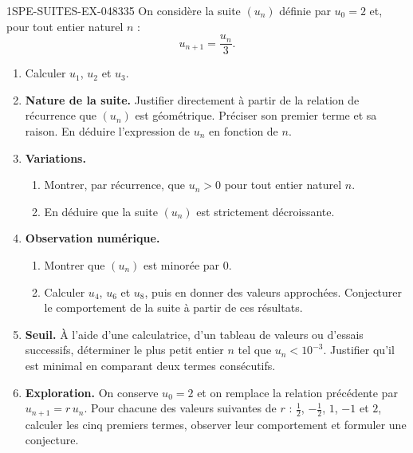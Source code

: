\begin{exercice}{1SPE-SUITES-EX-048}{3}{35}
On considère la suite $(u_n)$ définie par $u_0 = 2$ et, pour tout entier naturel $n$ :
\[
  u_{n+1} = \frac{u_n}{3}.
\]

\begin{enumerate}
  \item Calculer $u_1$, $u_2$ et $u_3$.

  \item \textbf{Nature de la suite.} Justifier directement à partir de la relation de récurrence que $(u_n)$ est géométrique. Préciser son premier terme et sa raison. En déduire l'expression de $u_n$ en fonction de $n$.

  \item \textbf{Variations.}
  \begin{enumerate}
    \item Montrer, par récurrence, que $u_n > 0$ pour tout entier naturel $n$.
    \item En déduire que la suite $(u_n)$ est strictement décroissante.
  \end{enumerate}

  \item \textbf{Observation numérique.}
  \begin{enumerate}
    \item Montrer que $(u_n)$ est minorée par $0$.
    \item Calculer $u_4$, $u_6$ et $u_8$, puis en donner des valeurs approchées. Conjecturer le comportement de la suite à partir de ces résultats.
  \end{enumerate}

  \item \textbf{Seuil.} À l'aide d'une calculatrice, d'un tableau de valeurs ou d'essais successifs, déterminer le plus petit entier $n$ tel que $u_n < 10^{-3}$. Justifier qu'il est minimal en comparant deux termes consécutifs.

  \item \textbf{Exploration.} On conserve $u_0=2$ et on remplace la relation précédente par $u_{n+1}=r\,u_n$. Pour chacune des valeurs suivantes de $r$ : $\frac{1}{2}$, $-\frac{1}{2}$, $1$, $-1$ et $2$, calculer les cinq premiers termes, observer leur comportement et formuler une conjecture.
\end{enumerate}
\end{exercice}
